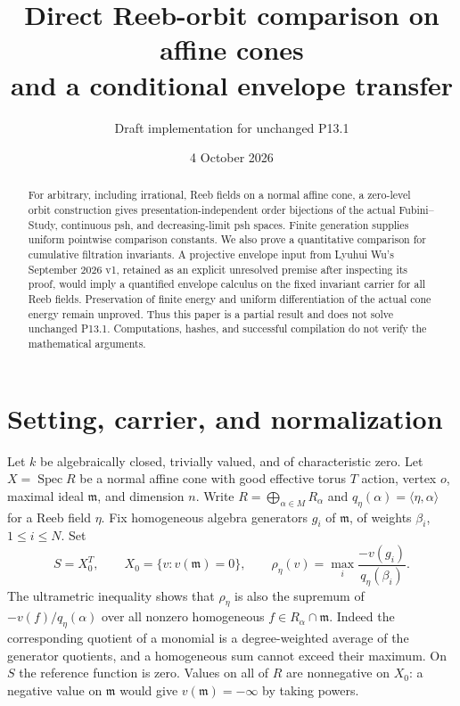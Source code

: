 \documentclass[11pt]{article}
\title{Direct Reeb-orbit comparison on affine cones\\and a conditional envelope transfer}
\author{Draft implementation for unchanged P13.1}
\date{4 October 2026}
\begin{document}
\maketitle
\begin{abstract}
For arbitrary, including irrational, Reeb fields on a normal affine cone, a zero-level orbit construction gives presentation-independent order bijections of the actual Fubini--Study, continuous psh, and decreasing-limit psh spaces. Finite generation supplies uniform pointwise comparison constants. We also prove a quantitative comparison for cumulative filtration invariants. A projective envelope input from Lyuhui Wu's September 2026 v1, retained as an explicit unresolved premise after inspecting its proof, would imply a quantified envelope calculus on the fixed invariant carrier for all Reeb fields. Preservation of finite energy and uniform differentiation of the actual cone energy remain unproved. Thus this paper is a partial result and does not solve unchanged P13.1. Computations, hashes, and successful compilation do not verify the mathematical arguments.
\end{abstract}

\section{Setting, carrier, and normalization}
Let $k$ be algebraically closed, trivially valued, and of characteristic zero.
Let $X=\operatorname{Spec}R$ be a normal affine cone with good effective torus $T$ action, vertex $o$, maximal ideal $\mathfrak m$, and dimension $n$.
Write $R=\bigoplus_{\alpha\in M}R_\alpha$ and $q_\eta(\alpha)=\langle\eta,\alpha\rangle$ for a Reeb field $\eta$.
Fix homogeneous algebra generators $g_i$ of $\mathfrak m$, of weights $\beta_i$, $1\leq i\leq N$.
Set
\[
 S=X_0^T,\qquad X_0=\{v:v(\mathfrak m)=0\},\qquad
 \rho_\eta(v)=\max_i\frac{-v(g_i)}{q_\eta(\beta_i)}.
\]
The ultrametric inequality shows that $\rho_\eta$ is also the supremum of $-v(f)/q_\eta(\alpha)$ over all nonzero homogeneous $f\in R_\alpha\cap\mathfrak m$.
Indeed the corresponding quotient of a monomial is a degree-weighted average of the generator quotients, and a homogeneous sum cannot exceed their maximum.
On $S$ the reference function is zero. Values on all of $R$ are nonnegative on $X_0$: a negative value on $\mathfrak m$ would give $v(\mathfrak m)=-\infty$ by taking powers.
\end{document}
